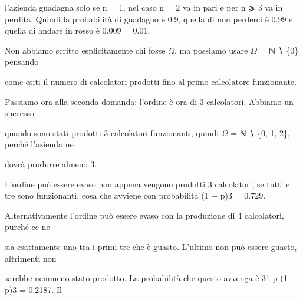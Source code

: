 \documentclass[a4paper,portrait,12pt]{article}
\begin{document}
\begin{flushleft}
l'azienda guadagna solo se n = 1, nel caso n = 2 va in pari e per n ⩾ 3 va in perdita. Quindi la probabilit\`{a} di guadagno \`{e} 0.9, quella di non perderci \`{e} 0.99 e quella di andare in rosso \`{e} 0.009̄ = 0.01.
\end{flushleft}


\begin{flushleft}
Non abbiamo scritto esplicitamente chi fosse $\Omega$, ma possiamo usare $\Omega$ = ℕ ∖ \{0\} pensando
\end{flushleft}


\begin{flushleft}
come esiti il numero di calcolatori prodotti fino al primo calcolatore funzionante.
\end{flushleft}


\begin{flushleft}
Passiamo ora alla seconda domanda: l'ordine \`{e} ora di 3 calcolatori. Abbiamo un successo
\end{flushleft}


\begin{flushleft}
quando sono stati prodotti 3 calcolatori funzionanti, quindi $\Omega$ = ℕ ∖ \{0, 1, 2\}, perch\'{e} l'azienda ne
\end{flushleft}


\begin{flushleft}
dovr\`{a} produrre almeno 3.
\end{flushleft}


\begin{flushleft}
L'ordine pu\`{o} essere evaso non appena vengono prodotti 3 calcolatori, se tutti e tre sono funzionanti, cosa che avviene con probabilit\`{a} (1 $-$ p)3 = 0.729.
\end{flushleft}


\begin{flushleft}
Alternativamente l'ordine pu\`{o} essere evaso con la produzione di 4 calcolatori, purch\'{e} ce ne
\end{flushleft}


\begin{flushleft}
sia esattamente uno tra i primi tre che \`{e} guasto. L'ultimo non pu\`{o} essere guasto, altrimenti non
\end{flushleft}


\begin{flushleft}
sarebbe nemmeno stato prodotto. La probabilit\`{a} che questo avvenga \`{e} 31 p (1 $-$ p)3 = 0.2187. Il
\end{flushleft}
\end{document}
